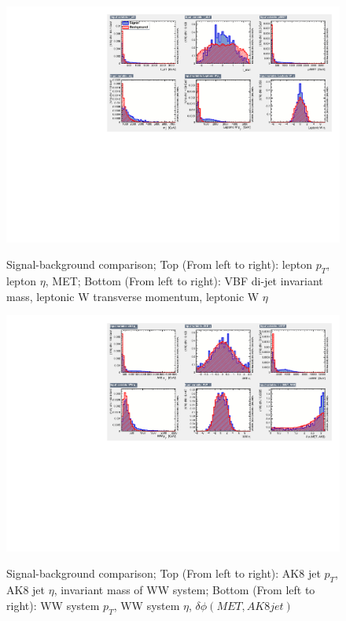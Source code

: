 \begin{figure}[h!]
	 \centering
	 {\includegraphics[scale=0.85]{Plots/BDT_Performance/Trial1/dataset/plots/canvas1.pdf}}
	 \caption{Signal-background comparison; Top (From left to right): lepton $p_T$, lepton $\eta$, MET; Bottom (From left to right): VBF di-jet invariant mass, leptonic W transverse momentum, leptonic W $\eta$ }
\end{figure}
\begin{figure}[h!]\ContinuedFloat
	 {\includegraphics[scale=0.85]{Plots/BDT_Performance/Trial1/dataset/plots/canvas2.pdf}}
	\caption{Signal-background comparison; Top (From left to right): AK8 jet $p_T$, AK8 jet $\eta$, invariant mass of WW system; Bottom (From left to right): WW system $p_T$, WW system $\eta$, $\delta \phi (MET, AK8 jet)$}
\end{figure}
